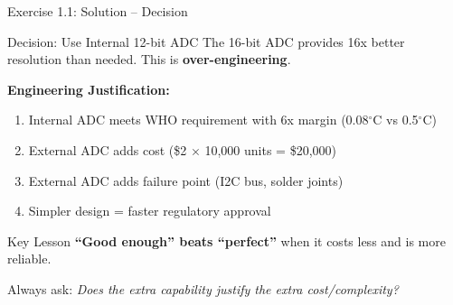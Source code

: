 \documentclass[aspectratio=169,11pt]{beamer}
\begin{document}
\begin{frame}{Exercise 1.1: Solution -- Decision}
    \begin{alertblock}{Decision: Use Internal 12-bit ADC}
        The 16-bit ADC provides 16x better resolution than needed. This is \textbf{over-engineering}.
    \end{alertblock}
    
    \vspace{0.3cm}
    \textbf{Engineering Justification:}
    \begin{enumerate}
        \item Internal ADC meets WHO requirement with 6x margin (0.08$^\circ$C vs 0.5$^\circ$C)
        \item External ADC adds cost (\$2 $\times$ 10,000 units = \$20,000)
        \item External ADC adds failure point (I2C bus, solder joints)
        \item Simpler design = faster regulatory approval
    \end{enumerate}
    
    \vspace{0.3cm}
    \begin{exampleblock}{Key Lesson}
        \textbf{``Good enough'' beats ``perfect''} when it costs less and is more reliable.
        
        Always ask: \textit{Does the extra capability justify the extra cost/complexity?}
    \end{exampleblock}
\end{frame}
\end{document}
